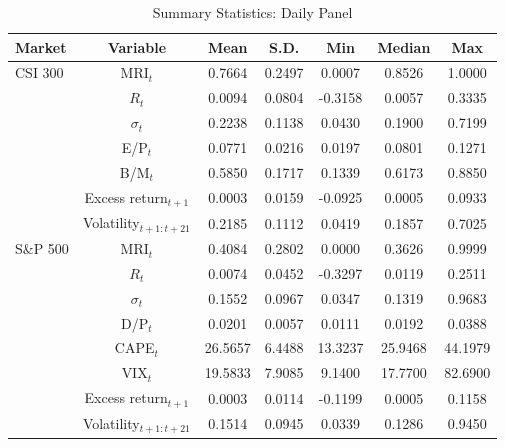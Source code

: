 \begin{table}[htbp]
\centering
\caption{Summary Statistics: Daily Panel}
\label{tab:descd}
\begin{tabular}{lcccccc}
\toprule
Market & Variable & Mean & S.D. & Min & Median & Max \\
\midrule
CSI 300 & MRI$_t$ & 0.7664 & 0.2497 & 0.0007 & 0.8526 & 1.0000 \\
 & $R_t$ & 0.0094 & 0.0804 & -0.3158 & 0.0057 & 0.3335 \\
 & $\sigma_t$ & 0.2238 & 0.1138 & 0.0430 & 0.1900 & 0.7199 \\
 & E/P$_t$ & 0.0771 & 0.0216 & 0.0197 & 0.0801 & 0.1271 \\
 & B/M$_t$ & 0.5850 & 0.1717 & 0.1339 & 0.6173 & 0.8850 \\
 & Excess return$_{t+1}$ & 0.0003 & 0.0159 & -0.0925 & 0.0005 & 0.0933 \\
 & Volatility$_{t+1:t+21}$ & 0.2185 & 0.1112 & 0.0419 & 0.1857 & 0.7025 \\
\midrule
S\&P 500 & MRI$_t$ & 0.4084 & 0.2802 & 0.0000 & 0.3626 & 0.9999 \\
 & $R_t$ & 0.0074 & 0.0452 & -0.3297 & 0.0119 & 0.2511 \\
 & $\sigma_t$ & 0.1552 & 0.0967 & 0.0347 & 0.1319 & 0.9683 \\
 & D/P$_t$ & 0.0201 & 0.0057 & 0.0111 & 0.0192 & 0.0388 \\
 & CAPE$_t$ & 26.5657 & 6.4488 & 13.3237 & 25.9468 & 44.1979 \\
 & VIX$_t$ & 19.5833 & 7.9085 & 9.1400 & 17.7700 & 82.6900 \\
 & Excess return$_{t+1}$ & 0.0003 & 0.0114 & -0.1199 & 0.0005 & 0.1158 \\
 & Volatility$_{t+1:t+21}$ & 0.1514 & 0.0945 & 0.0339 & 0.1286 & 0.9450 \\
\midrule
\bottomrule
\end{tabular}
\end{table}